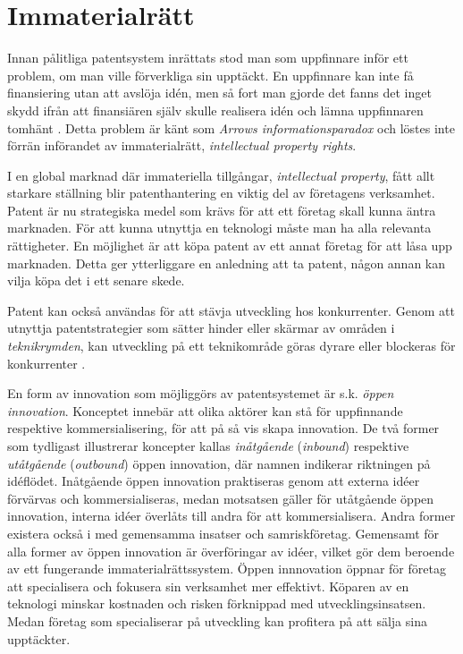 \section{Immaterialrätt}

Innan pålitliga patentsystem inrättats stod man som uppfinnare inför ett problem, om man ville förverkliga sin upptäckt.
En uppfinnare kan inte få finansiering utan att avslöja idén, men så fort man gjorde det fanns det inget skydd ifrån att finansiären själv skulle realisera idén och lämna uppfinnaren tomhänt \cite{nard}.
Detta problem är känt som \emph{Arrows informationsparadox} och löstes inte förrän införandet av immaterialrätt, \emph{intellectual property rights}.

I en global marknad där immateriella tillgångar, \emph{intellectual property}, fått allt starkare ställning blir patenthantering en viktig del av företagens verksamhet.
Patent är nu strategiska medel som krävs för att ett företag skall kunna äntra marknaden.
För att kunna utnyttja en teknologi måste man ha alla relevanta rättigheter.
En möjlighet är att köpa patent av ett annat företag för att låsa upp marknaden.
Detta ger ytterliggare en anledning att ta patent, någon annan kan vilja köpa det i ett senare skede.

Patent kan också användas för att stävja utveckling hos konkurrenter.
Genom att utnyttja patentstrategier som sätter hinder eller skärmar av områden i \emph{teknikrymden}, kan utveckling på ett teknikområde göras dyrare eller blockeras för konkurrenter \cite{ove}.

En form av innovation som möjliggörs av patentsystemet är s.k. \emph{öppen innovation}.
Konceptet innebär att olika aktörer kan stå för uppfinnande respektive kommersialisering, för att på så vis skapa innovation.
De två former som tydligast illustrerar koncepter kallas \emph{inåtgående} (\emph{inbound}) respektive \emph{utåtgående} (\emph{outbound}) öppen innovation, där namnen indikerar riktningen på idéflödet.
Inåtgående öppen innovation praktiseras genom att externa idéer förvärvas och kommersialiseras, medan motsatsen gäller för utåtgående öppen innovation, interna idéer överlåts till andra för att kommersialisera.
Andra former existera också i med gemensamma insatser och samriskföretag.
Gemensamt för alla former av öppen innovation är överföringar av idéer, vilket gör dem beroende av ett fungerande immaterialrättssystem.
Öppen innnovation öppnar för företag att specialisera och fokusera sin verksamhet mer effektivt.
Köparen av en teknologi minskar kostnaden och risken förknippad med utvecklingsinsatsen. 
Medan företag som specialiserar på utveckling kan profitera på att sälja sina upptäckter.
